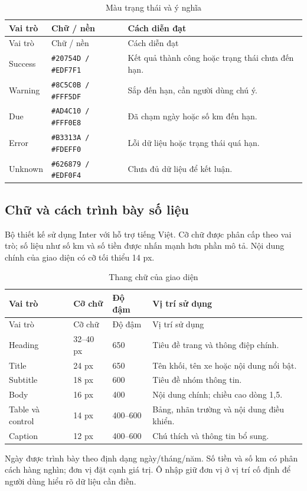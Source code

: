 \begin{smalltable}\begin{longtable}{L{2.6cm}L{5cm}L{6.8cm}}
\caption{Màu trạng thái và ý nghĩa}\\\toprule Vai trò & Chữ / nền & Cách diễn đạt\\\midrule\endfirsthead
\toprule Vai trò & Chữ / nền & Cách diễn đạt\\\midrule\endhead
Success & \texttt{\#20754D / \#EDF7F1} & Kết quả thành công hoặc trạng thái chưa đến hạn.\\
Warning & \texttt{\#8C5C0B / \#FFF5DF} & Sắp đến hạn, cần người dùng chú ý.\\
Due & \texttt{\#AD4C10 / \#FFF0E8} & Đã chạm ngày hoặc số km đến hạn.\\
Error & \texttt{\#B3313A / \#FDEFF0} & Lỗi dữ liệu hoặc trạng thái quá hạn.\\
Unknown & \texttt{\#626879 / \#EDF0F4} & Chưa đủ dữ liệu để kết luận.\\\bottomrule
\end{longtable}\end{smalltable}

\subsection{Chữ và cách trình bày số liệu}
Bộ thiết kế sử dụng Inter với hỗ trợ tiếng Việt. Cỡ chữ được phân cấp theo vai trò; số liệu như số km và số tiền được nhấn mạnh hơn phần mô tả. Nội dung chính của giao diện có cỡ tối thiểu 14 px.
\begin{smalltable}\begin{longtable}{L{4.2cm}L{2.3cm}L{2.5cm}L{5.3cm}}
\caption{Thang chữ của giao diện}\\\toprule Vai trò & Cỡ chữ & Độ đậm & Vị trí sử dụng\\\midrule\endfirsthead
\toprule Vai trò & Cỡ chữ & Độ đậm & Vị trí sử dụng\\\midrule\endhead
Heading & 32--40 px & 650 & Tiêu đề trang và thông điệp chính.\\
Title & 24 px & 650 & Tên khối, tên xe hoặc nội dung nổi bật.\\
Subtitle & 18 px & 600 & Tiêu đề nhóm thông tin.\\
Body & 16 px & 400 & Nội dung chính; chiều cao dòng 1,5.\\
Table và control & 14 px & 400--600 & Bảng, nhãn trường và nội dung điều khiển.\\
Caption & 12 px & 400--600 & Chú thích và thông tin bổ sung.\\\bottomrule
\end{longtable}\end{smalltable}
Ngày được trình bày theo định dạng ngày/tháng/năm. Số tiền và số km có phân cách hàng nghìn; đơn vị đặt cạnh giá trị. Ô nhập giữ đơn vị ở vị trí cố định để người dùng hiểu rõ dữ liệu cần điền.

